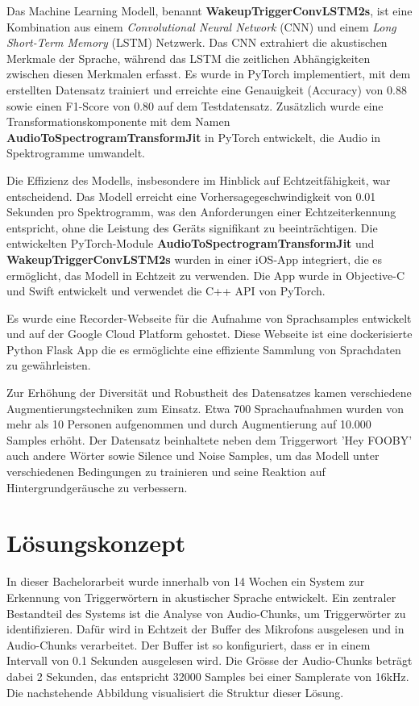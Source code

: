 \documentclass[11pt,a4paper]{article}
\begin{document}
\noindent
Das Machine Learning Modell, benannt \textbf{WakeupTriggerConvLSTM2s}, ist eine Kombination aus einem \textit{Convolutional Neural Network} (CNN) und einem \textit{Long Short-Term Memory} (LSTM) Netzwerk. Das CNN extrahiert die akustischen Merkmale der Sprache, während das LSTM die zeitlichen Abhängigkeiten zwischen diesen Merkmalen erfasst. Es wurde in PyTorch implementiert, mit dem erstellten Datensatz trainiert und erreichte eine Genauigkeit (Accuracy) von 0.88 sowie einen F1-Score von 0.80 auf dem Testdatensatz. Zusätzlich wurde eine Transformationskomponente mit dem Namen \textbf{AudioToSpectrogramTransformJit} in PyTorch entwickelt, die Audio in Spektrogramme umwandelt.

\noindent \newline
Die Effizienz des Modells, insbesondere im Hinblick auf Echtzeitfähigkeit, war entscheidend. Das Modell erreicht eine Vorhersagegeschwindigkeit von 0.01 Sekunden pro Spektrogramm, was den Anforderungen einer Echtzeiterkennung entspricht, ohne die Leistung des Geräts signifikant zu beeinträchtigen. Die entwickelten PyTorch-Module \textbf{AudioToSpectrogramTransformJit} und \textbf{WakeupTriggerConvLSTM2s} wurden in einer iOS-App integriert, die es ermöglicht, das Modell in Echtzeit zu verwenden. Die App wurde in Objective-C und Swift entwickelt und verwendet die C++ API von PyTorch.

\noindent \newline
Es wurde eine Recorder-Webseite für die Aufnahme von Sprachsamples entwickelt und auf der Google Cloud Platform gehostet. Diese Webseite ist eine dockerisierte Python Flask App die es ermöglichte eine effiziente Sammlung von Sprachdaten zu gewährleisten.

\noindent \newline
Zur Erhöhung der Diversität und Robustheit des Datensatzes kamen verschiedene Augmentierungstechniken zum Einsatz. Etwa 700 Sprachaufnahmen wurden von mehr als 10 Personen aufgenommen und durch Augmentierung auf 10.000 Samples erhöht. Der Datensatz beinhaltete neben dem Triggerwort 'Hey FOOBY' auch andere Wörter sowie Silence und Noise Samples, um das Modell unter verschiedenen Bedingungen zu trainieren und seine Reaktion auf Hintergrundgeräusche zu verbessern.


\newpage
\section{Lösungskonzept}
In dieser Bachelorarbeit wurde innerhalb von 14 Wochen ein System zur Erkennung von Triggerwörtern in akustischer Sprache entwickelt. Ein zentraler Bestandteil des Systems ist die Analyse von Audio-Chunks, um Triggerwörter zu identifizieren. Dafür wird in Echtzeit der Buffer des Mikrofons ausgelesen und in Audio-Chunks verarbeitet. Der Buffer ist so konfiguriert, dass er in einem Intervall von 0.1 Sekunden ausgelesen wird. Die Grösse der Audio-Chunks beträgt dabei 2 Sekunden, das entspricht 32000 Samples bei einer Samplerate von 16kHz. Die nachstehende Abbildung visualisiert die Struktur dieser Lösung.
\end{document}
